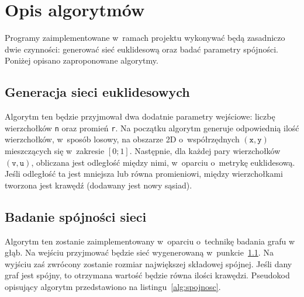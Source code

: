 \section{Opis algorytmów}
	\label{projekt:algorytmy}

	Programy zaimplementowane w~ramach projektu wykonywać będą zasadniczo dwie czynności: generować sieć euklidesową oraz badać parametry spójności. Poniżej opisano zaproponowane algorytmy.

	\subsection{Generacja sieci euklidesowych}
		\label{projekt:algorytmy:generacja}


		Algorytm ten będzie przyjmował dwa dodatnie parametry wejściowe: liczbę wierzchołków \texttt{n} oraz promień \texttt{r}. Na początku algorytm generuje odpowiednią ilość wierzchołków, w~sposób losowy, na obszarze 2D o~współrzędnych $(\texttt{x}, \texttt{y})$ mieszczących się w~zakresie $[0; 1]$. Następnie, dla każdej pary wierzchołków $(\texttt{v}, \texttt{u})$, obliczana jest odległość między nimi, w~oparciu o~metrykę euklidesową. Jeśli odległość ta jest mniejsza lub równa promieniowi, między wierzchołkami tworzona jest krawędź (dodawany jest nowy sąsiad).

	\subsection{Badanie spójności sieci}
		\label{projekt:algorytmy:spojnosc}

		Algorytm ten zostanie zaimplementowany w~oparciu o~technikę badania grafu w głąb\cite[s.~270]{WojciechowskiJacek2013Gis}. Na wejściu przyjmować będzie sieć wygenerowaną w~punkcie~\ref{projekt:algorytmy:generacja}. Na wyjściu zaś zwrócony zostanie rozmiar największej składowej spójnej. Jeśli dany graf jest spójny, to otrzymana wartość będzie równa ilości krawędzi. Pseudokod opisujący algorytm przedstawiono na listingu~\ref{alg:spojnosc}.

